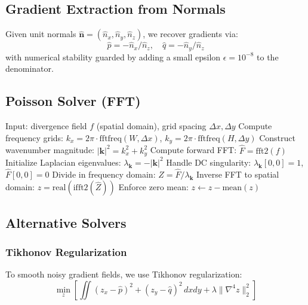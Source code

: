 \documentclass[11pt]{article}
\begin{document}
\subsection{Gradient Extraction from Normals}

Given unit normals $\hat{\mathbf{n}} = (\hat{n}_x, \hat{n}_y, \hat{n}_z)$, we recover gradients via:
\begin{equation}
\hat{p} = -\hat{n}_x / \hat{n}_z, \quad \hat{q} = -\hat{n}_y / \hat{n}_z
\end{equation}
with numerical stability guarded by adding a small epsilon $\epsilon = 10^{-8}$ to the denominator.

\subsection{Poisson Solver (FFT)}

\begin{algorithm}
\caption{FFT-Based Poisson Equation Solver}
\begin{algorithmic}
\STATE Input: divergence field $f$ (spatial domain), grid spacing $\Delta x, \Delta y$
\STATE Compute frequency grids: $k_x = 2\pi \cdot \text{fftfreq}(W, \Delta x)$, $k_y = 2\pi \cdot \text{fftfreq}(H, \Delta y)$
\STATE Construct wavenumber magnitude: $|\mathbf{k}|^2 = k_x^2 + k_y^2$
\STATE Compute forward FFT: $\hat{F} = \text{fft2}(f)$
\STATE Initialize Laplacian eigenvalues: $\lambda_{\mathbf{k}} = -|\mathbf{k}|^2$
\STATE Handle DC singularity: $\lambda_{\mathbf{k}}[0,0] = 1$, $\hat{F}[0,0] = 0$
\STATE Divide in frequency domain: $\hat{Z} = \hat{F} / \lambda_{\mathbf{k}}$
\STATE Inverse FFT to spatial domain: $z = \text{real}(\text{ifft2}(\hat{Z}))$
\STATE Enforce zero mean: $z \leftarrow z - \text{mean}(z)$
\end{algorithmic}
\end{algorithm}

\subsection{Alternative Solvers}

\subsubsection{Tikhonov Regularization}

To smooth noisy gradient fields, we use Tikhonov regularization:
\begin{equation}
\min_z \left[\iint (z_x - \hat{p})^2 + (z_y - \hat{q})^2 \, dx dy + \lambda \|\nabla^4 z\|_2^2\right]
\end{equation}
\end{document}
